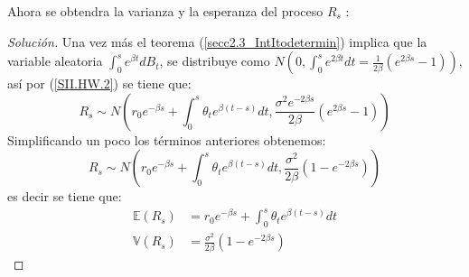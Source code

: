 \documentclass[11pt,notitlepage]{article}
\newenvironment{solucion}
  {\begin{proof}[Solución]}
  {\end{proof}}
\begin{document}
         Ahora se obtendra la varianza y la esperanza del proceso \(R_s\) :
    \begin{solucion}
    Una vez más el teorema (\ref{secc2.3_IntItodetermin}) implica que la variable aleatoria \(\int_{0}^{s}e^{\beta t}dB_t\), se distribuye como
    \(N\left(0,\int_{0}^{s}e^{2\beta t}dt = \frac{1}{2\beta} \left(e^{2\beta s} - 1 \right) \right)\), así por (\ref{SII.HW.2}) se tiene que: 
    \[R_s\sim N\left(  r_0e^{-\beta s} + \int_{0}^{s}\theta_{t}e^{\beta(t-s)}dt,\frac{\sigma^2 e^{-2\beta s}}{2\beta}
    \left(e^{2\beta s} - 1 \right)\right)\]
    Simplificando un poco los términos anteriores obtenemos: 
    \begin{equation*}
        R_s\sim N\left(  r_0e^{-\beta s} + \int_{0}^{s}\theta_{t}e^{\beta(t-s)}dt,\frac{\sigma^2}{2\beta}
    \left(1 - e^{-2\beta s} \right)\right)
    \end{equation*}
    es decir se tiene que:
    \begin{align*}
        \mathbb{E}(R_s) &=  r_0e^{-\beta s} + \int_{0}^{s}\theta_{t}e^{\beta(t-s)}dt\\
        \mathbb{V}(R_s) &= \frac{\sigma^2}{2\beta}\left(1 - e^{-2\beta s} \right)
    \end{align*}
    \end{solucion}
    
\end{document}
